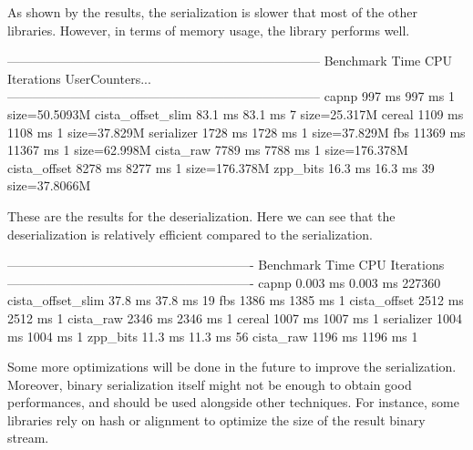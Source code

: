 As shown by the results, the serialization is slower that most of the other
libraries. However, in terms of memory usage, the library performs well.

\begin{terminal}
--------------------------------------------------------------------------
Benchmark                Time             CPU   Iterations UserCounters...
--------------------------------------------------------------------------
capnp                  997 ms          997 ms            1 size=50.5093M
cista_offset_slim     83.1 ms         83.1 ms            7 size=25.317M
cereal                1109 ms         1108 ms            1 size=37.829M
serializer            1728 ms         1728 ms            1 size=37.829M
fbs                  11369 ms        11367 ms            1 size=62.998M
cista_raw             7789 ms         7788 ms            1 size=176.378M
cista_offset          8278 ms         8277 ms            1 size=176.378M
zpp_bits              16.3 ms         16.3 ms           39 size=37.8066M
\end{terminal}\leavevmode\newline

These are the results for the deserialization. Here we can see that the
deserialization is relatively efficient compared to the serialization.

\begin{terminal}
----------------------------------------------------------
Benchmark                Time             CPU   Iterations
----------------------------------------------------------
capnp                0.003 ms        0.003 ms       227360
cista_offset_slim     37.8 ms         37.8 ms           19
fbs                   1386 ms         1385 ms            1
cista_offset          2512 ms         2512 ms            1
cista_raw             2346 ms         2346 ms            1
cereal                1007 ms         1007 ms            1
serializer            1004 ms         1004 ms            1
zpp_bits              11.3 ms         11.3 ms           56
cista_raw             1196 ms         1196 ms            1
\end{terminal}\leavevmode\newline

Some more optimizations will be done in the future to improve the serialization.
Moreover, binary serialization itself might not be enough to obtain good
performances, and should be used alongside other techniques. For instance, some
libraries rely on hash or alignment to optimize the size of the result binary
stream.

